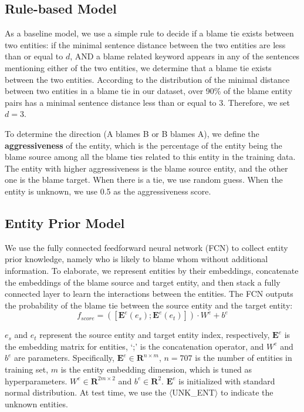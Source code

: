 \documentclass[letterpaper]{article} %
\begin{document}
\subsection{Rule-based Model}
As a baseline model, we use a simple rule to decide if a blame tie exists between two entities: if the minimal sentence distance between the two entities are less than or equal to $d$, AND a blame related keyword appears in any of the sentences mentioning either of the two entities, we determine that a blame tie exists between the two entities. According to the distribution of the minimal distance between two entities in a blame tie in our dataset, over 90\% of the blame entity pairs has a minimal sentence distance less than or equal to 3. Therefore, we set $d=3$.

To determine the direction (A blames B or B blames A), we define the {\bf aggressiveness} of the entity, which is the percentage of the entity being the blame source among all the blame ties related to this entity in the training data. The entity with higher aggressiveness is the blame source entity, and the other one is the blame target. When there is a tie, we use random guess. When the entity is unknown, we use 0.5 as the aggressiveness score.

\subsection{Entity Prior Model}
\label{entitymodel}
We use the fully connected feedforward neural network (FCN) to collect entity prior knowledge, namely who is likely to blame whom without additional information. To elaborate, we represent entities by their embeddings, concatenate the embeddings of the blame source and target entity, and then stack a fully connected layer to learn the interactions between the entities. The FCN outputs the probability of the blame tie between the source entity and the target entity: $$f_{score} = ([\mathbf{E}^e(e_s); \mathbf{E}^e(e_t)]) \cdot W^e + b^e $$

$e_s$ and $e_t$ represent the source entity and target entity index, respectively, $\mathbf{E}^e$ is the embedding matrix for entities, `;' is the concatenation operator, and $W^e$ and $b^e$ are parameters. Specifically, $\mathbf{E}^e \in \mathbf{R}^{n\times m}$, $n=707$ is the number of entities in training set, $m$ is the entity embedding dimension, which is tuned as hyperparameters. $W^e \in \mathbf{R}^{2m\times 2}$ and $b^e \in \mathbf{R}^{2} $. $\mathbf{E}^e$ is initialized with standard normal distribution. At test time, we use the $\langle$UNK\_ENT$\rangle$ to indicate the unknown entities.
\end{document}
